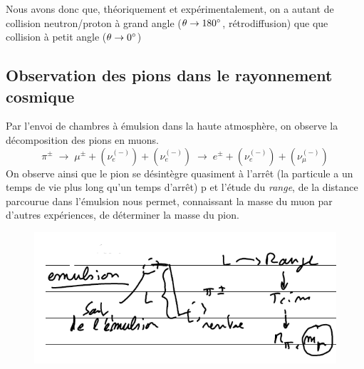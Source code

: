Nous avons donc que, théoriquement et expérimentalement, on a autant de collision neutron/proton à grand angle ($\theta \rightarrow 180\degree$, rétrodiffusion) que que collision à petit angle ($\theta \rightarrow 0\degree$) 


\subsection{Observation des pions dans le rayonnement cosmique}


Par l'envoi de chambres à émulsion dans la haute atmosphère, on observe la décomposition des pions en muons. 
\[
    \pi^\pm \; \longrightarrow \; \mu^\pm +(\nu^{(-)}_e) + (\nu^{(-)}_e)\; \longrightarrow \; e^\pm  + (\nu_e^{(-)})  + (\nu_\mu^{(-)})
\]
On observe ainsi que le pion se désintègre quasiment à l'arrêt (la particule a un temps de vie plus long qu'un temps d'arrêt)   p et l'étude du \emph{range}, de la distance parcourue dans l'émulsion nous permet, connaissant la masse du muon par d'autres expériences, de déterminer la masse du pion.\\


\begin{figure}[H]
    \centering
    \includegraphics{Images4/masse_pion.PNG}
\end{figure}

